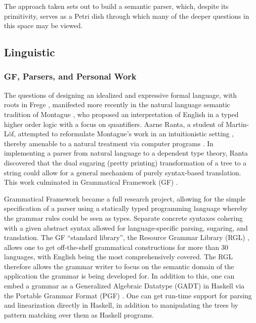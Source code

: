 \documentclass{article}
\begin{document}
The approach taken sets out to build a semantic parser, which, despite its
primitivity, serves as a Petri dish through which many of the deeper questions
in this space may be viewed.

\subsection{Linguistic}

\subsubsection{GF, Parsers, and Personal Work}

The questions of designing an idealized and expressive formal language, with
roots in Frege \cite{frege79}, manifested more recently in the natural language
semantic tradition of Montague \cite{Montague1973}, who proposed an
interpretation of English in a typed higher order logic with a focus on
quantifiers. Aarne Ranta, a student of Martin-Löf, attempted to reformulate
Montague's work in an intuitionistic setting \cite{ranta1994type}, thereby
amenable to a natural treatment via computer programs \cite{ml79}. In
implementing a parser from natural language to a dependent type theory, Ranta
discovered that the dual sugaring (pretty printing) transformation of a tree to
a string could allow for a general mechanism of purely syntax-based translation.
This work culminated in Grammatical Framework (GF) \cite{ranta_2004}.

Grammatical Framework became a full research project, allowing for the simple
specification of a parser using a statically typed programming language whereby
the grammar rules could be seen as types. Separate concrete syntaxes cohering
with a given abstract syntax allowed for language-specific parsing, sugaring,
and translation. The GF ``standard library'', the Resource Grammar Library (RGL)
\cite{ranta2009rgl}, allows one to get off-the-shelf grammatical constructions
for more than 30 languages, with English being the most comprehensively covered. The RGL
therefore allows the grammar writer to focus on the semantic domain of the
application the grammar is being developed for. In addition to this, one can
embed a grammar as a Generalized Algebraic Datatype (GADT) in Haskell via the
Portable Grammar Format (PGF) \cite{angelov2010pgf}. One can get run-time
support for parsing and linearization directly in Haskell, in addition to
manipulating the trees by pattern matching over them as Haskell programs.
\end{document}
